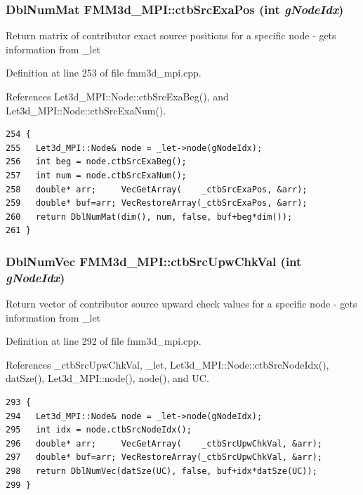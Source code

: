 \subsubsection{\setlength{\rightskip}{0pt plus 5cm}Dbl\-Num\-Mat FMM3d\_\-MPI::ctb\-Src\-Exa\-Pos (int {\em g\-Node\-Idx})\hspace{0.3cm}{\tt  [protected]}}\label{classFMM3d__MPI_5f4337de8f526dee009dc39c7c3213a6_5f4337de8f526dee009dc39c7c3213a6}


Return matrix of contributor exact source positions for a specific node - gets information from \_\-let 

Definition at line 253 of file fmm3d\_\-mpi.cpp.

References Let3d\_\-MPI::Node::ctb\-Src\-Exa\-Beg(), and Let3d\_\-MPI::Node::ctb\-Src\-Exa\-Num().

\footnotesize\begin{verbatim}254 {
255   Let3d_MPI::Node& node = _let->node(gNodeIdx);
256   int beg = node.ctbSrcExaBeg();
257   int num = node.ctbSrcExaNum();
258   double* arr;     VecGetArray(    _ctbSrcExaPos, &arr);
259   double* buf=arr; VecRestoreArray(_ctbSrcExaPos, &arr);
260   return DblNumMat(dim(), num, false, buf+beg*dim());
261 }
\end{verbatim}\normalsize 


\subsubsection{\setlength{\rightskip}{0pt plus 5cm}Dbl\-Num\-Vec FMM3d\_\-MPI::ctb\-Src\-Upw\-Chk\-Val (int {\em g\-Node\-Idx})\hspace{0.3cm}{\tt  [protected]}}\label{classFMM3d__MPI_db4b073fb62e65e5c0a52a3bcfe512c1_db4b073fb62e65e5c0a52a3bcfe512c1}


Return vector of contributor source upward check values for a specific node - gets information from \_\-let 

Definition at line 292 of file fmm3d\_\-mpi.cpp.

References \_\-ctb\-Src\-Upw\-Chk\-Val, \_\-let, Let3d\_\-MPI::Node::ctb\-Src\-Node\-Idx(), dat\-Sze(), Let3d\_\-MPI::node(), node(), and UC.

\footnotesize\begin{verbatim}293 {
294   Let3d_MPI::Node& node = _let->node(gNodeIdx);
295   int idx = node.ctbSrcNodeIdx();
296   double* arr;     VecGetArray(    _ctbSrcUpwChkVal, &arr);
297   double* buf=arr; VecRestoreArray(_ctbSrcUpwChkVal, &arr);
298   return DblNumVec(datSze(UC), false, buf+idx*datSze(UC));
299 }
\end{verbatim}\normalsize 


